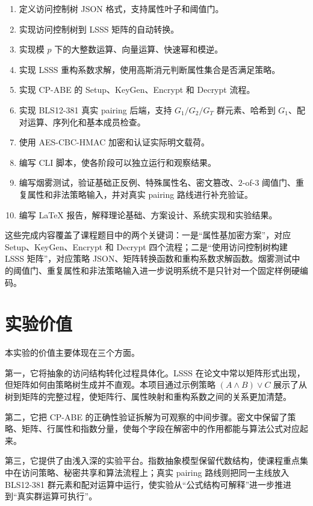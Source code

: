 \begin{enumerate}
    \item 定义访问控制树 JSON 格式，支持属性叶子和阈值门。
    \item 实现访问控制树到 LSSS 矩阵的自动转换。
    \item 实现模 $p$ 下的大整数运算、向量运算、快速幂和模逆。
    \item 实现 LSSS 重构系数求解，使用高斯消元判断属性集合是否满足策略。
    \item 实现 CP-ABE 的 Setup、KeyGen、Encrypt 和 Decrypt 流程。
    \item 实现 BLS12-381 真实 pairing 后端，支持 $G_1/G_2/G_T$ 群元素、哈希到 $G_1$、配对运算、序列化和基本成员检查。
    \item 使用 AES-CBC-HMAC 加密和认证实际明文载荷。
    \item 编写 CLI 脚本，使各阶段可以独立运行和观察结果。
    \item 编写烟雾测试，验证基础正反例、特殊属性名、密文篡改、$2$-of-$3$ 阈值门、重复属性和非法策略输入，并对真实 pairing 路线进行补充验证。
    \item 编写 LaTeX 报告，解释理论基础、方案设计、系统实现和实验结果。
\end{enumerate}

这些完成内容覆盖了课程题目中的两个关键词：一是“属性基加密方案”，对应 Setup、KeyGen、Encrypt 和 Decrypt 四个流程；二是“使用访问控制树构建 LSSS 矩阵”，对应策略 JSON、矩阵转换函数和重构系数求解函数。烟雾测试中的阈值门、重复属性和非法策略输入进一步说明系统不是只针对一个固定样例硬编码。

\section{实验价值}

本实验的价值主要体现在三个方面。

第一，它将抽象的访问结构转化过程具体化。LSSS 在论文中常以矩阵形式出现，但矩阵如何由策略树生成并不直观。本项目通过示例策略 $(A\wedge B)\vee C$ 展示了从树到矩阵的完整过程，使矩阵行、属性映射和重构系数之间的关系更加清楚。

第二，它把 CP-ABE 的正确性验证拆解为可观察的中间步骤。密文中保留了策略、矩阵、行属性和指数分量，使每个字段在解密中的作用都能与算法公式对应起来。

第三，它提供了由浅入深的实验平台。指数抽象模型保留代数结构，使课程重点集中在访问策略、秘密共享和算法流程上；真实 pairing 路线则把同一主线放入 BLS12-381 群元素和配对运算中运行，使实验从“公式结构可解释”进一步推进到“真实群运算可执行”。

